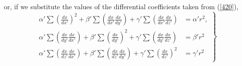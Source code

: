 \documentclass[12pt]{article}
\begin{document}
{or, if we substitute the values of the differential coefficients taken from (\ref{420}),
\begin{equation} \left. \begin{aligned}
\alpha' \sum \left( \frac{dx}{dx'} \right)^2 +              \beta' \sum \left( \frac{dx}{dx'}\frac{dx}{dy'} \right)   + \gamma' \sum \left( \frac{dx}{dx'}\frac{dx}{dz'} \right) &= \alpha' r^2, \\
\alpha' \sum \left(  \frac{dx}{dy'}\frac{dx}{dx'} \right) + \beta' \sum \left( \frac{dx}{dy'} \right)^2   +             \gamma' \sum \left( \frac{dx}{dy'}\frac{dx}{dz'} \right) &=  \beta'r^2 \\
\alpha' \sum \left(  \frac{dx}{dz'}\frac{dx}{dx'} \right) + \beta' \sum \left( \frac{dx}{dz'} \frac{dx}{dy'} \right)  + \gamma' \sum \left( \frac{dx}{dz'} \right)^2 &= \gamma' r^2
\end{aligned}
\right\}
\label{429}
\end{equation}

}
\end{document}
